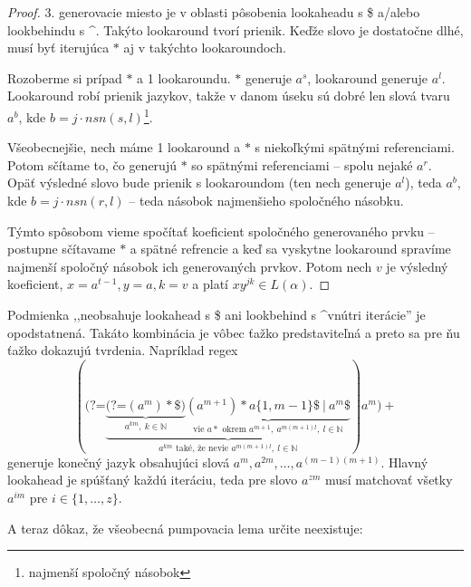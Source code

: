 \documentclass{svk_long_sk}
\def\N{\mathds{N}} %
\def\lookahead{\text{(?=}}
\begin{document}
\begin{proof}
3. generovacie miesto je v oblasti pôsobenia lookaheadu s \$ a/alebo lookbehindu s \textasciicircum. Takýto lookaround tvorí prienik. Keďže slovo je dostatočne dlhé, musí byť iterujúca $*$ aj v takýchto lookaroundoch.

Rozoberme si prípad $*$ a 1 lookaroundu. $*$ generuje $a^s$, lookaround generuje $a^l$. Lookaround robí prienik jazykov, takže v danom úseku sú dobré len slová tvaru $a^b$, kde $b=j\cdot nsn(s,l)$\footnote{najmenší spoločný násobok}.

Všeobecnejšie, nech máme 1 lookaround a $*$ s niekoľkými spätnými referenciami. Potom sčítame to, čo generujú $*$ so spätnými referenciami -- spolu nejaké $a^r$. Opäť výsledné slovo bude prienik s lookaroundom (ten nech generuje $a^l$), teda $a^b$, kde $b=j\cdot nsn(r,l)$ -- teda násobok najmenšieho spoločného násobku.

Týmto spôsobom vieme spočítať koeficient spoločného generovaného prvku -- postupne sčítavame $*$ a  spätné refrencie a keď sa vyskytne lookaround spravíme najmenší spoločný násobok ich generovaných prvkov. Potom nech $v$ je výsledný koeficient, $x=a^{t-1}, y=a, k=v$ a platí $xy^{jk}\in L(\alpha)$.
\end{proof}

Podmienka ,,neobsahuje lookahead s \$ ani lookbehind s \textasciicircum vnútri iterácie'' je opodstatnená. Takáto kombinácia je vôbec ťažko predstaviteľná a preto sa pre ňu ťažko dokazujú tvrdenia. Napríklad regex
$$(\lookahead \underbrace{
 \underbrace{ \lookahead (a^m)*\$ )}_{a^{km},~ k\in\N} 
 \underbrace{(a^{m+1})* a\lbrace 1,m-1\rbrace \$ ~|~ a^m \$ }_{\text{vie } a* \text{ okrem } a^{m+1},~a^{m(m+1)l},~ l\in\N} 
 }_{a^{km} \text{ také, že nevie } a^{m(m+1)l}, ~l\in\N }
  ) a^m)+$$
generuje konečný jazyk obsahujúci slová $a^m,\allowbreak a^{2m},\dots,\allowbreak a^{(m-1)(m+1)}$. Hlavný lookahead je spúšťaný každú iteráciu, teda pre slovo $a^{zm}$ musí matchovať všetky $a^{im}$ pre $i\in\lbrace 1,\dots,z\rbrace$.

A teraz dôkaz, že všeobecná pumpovacia lema určite neexistuje:
\end{document}
